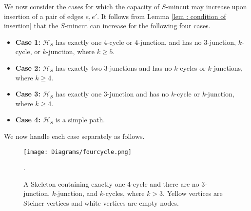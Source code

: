 \documentclass[letterpaper,11pt]{article}
\begin{document}
We now consider the cases for which the capacity of $S$-mincut may increase upon insertion of a pair of edges $e,e'$. It follows from Lemma \ref{lem : condition of insertion} that the $S$-mincut can increase for the following four cases. 
\begin{itemize}
    \item \textbf{Case 1:} ${\mathcal H}_S$ has exactly one $4$-cycle or $4$-junction, and has no $3$-junction, $k$-cycle, or $k$-junction, where $k\ge 5$. 
    \item \textbf{Case 2:} ${\mathcal H}_S$ has exactly two $3$-junctions and has no $k$-cycles or $k$-junctions, where $k\ge 4$.
\item \textbf{Case 3:} ${\mathcal H}_S$ has exactly one $3$-junction and has no $k$-cycle or $k$-junction, where $k\ge 4$. 
    \item \textbf{Case 4:} ${\mathcal H}_S$ is a simple path.     
\end{itemize}
We now handle each case separately as follows. \\
\begin{figure}
 \centering
    \texttt{[image: Diagrams/fourcycle.png]} 
   \caption{A Skeleton containing exactly one 4-cycle and there are no $3$-junction, $k$-junction, and $k$-cycles, where $k>3$. Yellow vertices are Steiner vertices and white vertices are empty nodes. }
  \label{fig : dual insertion, four cycle}. 
\end{figure}
\end{document}
